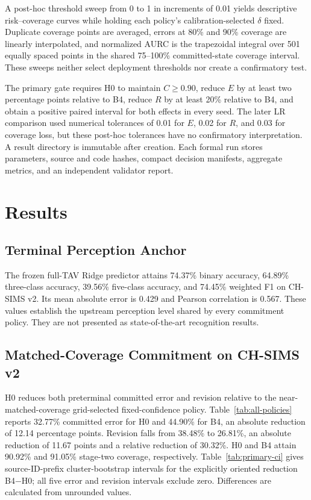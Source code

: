 \documentclass[journal]{IEEEtran}
\begin{document}
A post-hoc threshold sweep from 0 to 1 in increments of 0.01 yields descriptive risk--coverage curves while holding each policy's calibration-selected $\delta$ fixed. Duplicate coverage points are averaged, errors at 80\% and 90\% coverage are linearly interpolated, and normalized AURC is the trapezoidal integral over 501 equally spaced points in the shared 75--100\% committed-state coverage interval. These sweeps neither select deployment thresholds nor create a confirmatory test.

The primary gate requires H0 to maintain $C\geq0.90$, reduce $E$ by at least two percentage points relative to B4, reduce $R$ by at least 20\% relative to B4, and obtain a positive paired interval for both effects in every seed. The later LR comparison used numerical tolerances of 0.01 for $E$, 0.02 for $R$, and 0.03 for coverage loss, but these post-hoc tolerances have no confirmatory interpretation. A result directory is immutable after creation. Each formal run stores parameters, source and code hashes, compact decision manifests, aggregate metrics, and an independent validator report.

\section{Results}

\subsection{Terminal Perception Anchor}

The frozen full-TAV Ridge predictor attains 74.37\% binary accuracy, 64.89\% three-class accuracy, 39.56\% five-class accuracy, and 74.45\% weighted F1 on CH-SIMS v2. Its mean absolute error is 0.429 and Pearson correlation is 0.567. These values establish the upstream perception level shared by every commitment policy. They are not presented as state-of-the-art recognition results.

\subsection{Matched-Coverage Commitment on CH-SIMS v2}

H0 reduces both preterminal committed error and revision relative to the near-matched-coverage grid-selected fixed-confidence policy. Table~\ref{tab:all-policies} reports 32.77\% committed error for H0 and 44.90\% for B4, an absolute reduction of 12.14 percentage points. Revision falls from 38.48\% to 26.81\%, an absolute reduction of 11.67 points and a relative reduction of 30.32\%. H0 and B4 attain 90.92\% and 91.05\% stage-two coverage, respectively. Table~\ref{tab:primary-ci} gives source-ID-prefix cluster-bootstrap intervals for the explicitly oriented reduction B4$-$H0; all five error and revision intervals exclude zero. Differences are calculated from unrounded values.
\end{document}
